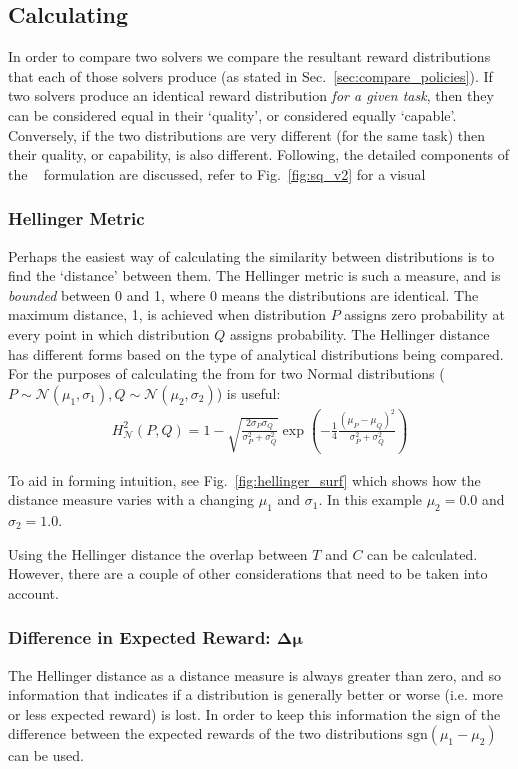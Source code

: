 \subsection{Calculating \xQ}
In order to compare two solvers we compare the resultant reward distributions that each of those solvers produce (as stated in Sec.~\ref{sec:compare_policies}). If two solvers produce an identical reward distribution \emph{for a given task}, then they can be considered equal in their `quality', or considered equally `capable'. Conversely, if the two distributions are very different (for the same task) then their quality, or capability, is also different. Following, the detailed components of the \xQ~ formulation are discussed, refer to Fig.~\ref{fig:sq_v2} for a visual 

\subsubsection{Hellinger Metric} \label{sec:hellinger}
Perhaps the easiest way of calculating the similarity between distributions is to find the `distance' between them. The Hellinger metric is such a measure, and is \emph{bounded} between 0 and 1, where 0 means the distributions are identical. The maximum distance, 1, is achieved when distribution $P$ assigns zero probability at every point in which distribution $Q$ assigns probability.  The Hellinger distance has different forms based on the type of analytical distributions being compared. For the purposes of calculating \xQ{} the from for two Normal distributions ($P \sim \mathcal{N}(\mu_1,\sigma_1), Q\sim\mathcal{N}(\mu_2,\sigma_2)$) is useful:
\begin{align}
    H_{\mathcal{N}}^{2}(P,Q) = 1-\sqrt{\frac{2\sigma_P\sigma_Q}{\sigma_P^2+\sigma_Q^2}}\exp{\left(-\frac{1}{4}\frac{(\mu_P-\mu_Q)^2}{\sigma_P^2+\sigma_Q^2}\right)}
\end{align}

To aid in forming intuition, see Fig.~\ref{fig:hellinger_surf} which shows how the distance measure varies with a changing $\mu_1$ and $\sigma_1$. In this example $\mu_2=0.0$ and $\sigma_2=1.0$.

Using the Hellinger distance the overlap between $T$ and $C$ can be calculated. However, there are a couple of other considerations that need to be taken into account. 

\subsubsection{Difference in Expected Reward: $\pmb{\Delta \mu}$}
The Hellinger distance as a distance measure is always greater than zero, and so information that indicates if a distribution is generally better or worse (i.e. more or less expected reward) is lost. In order to keep this information the sign of the difference between the expected rewards of the two distributions $\text{sgn}(\mu_1-\mu_2)$ can be used.

